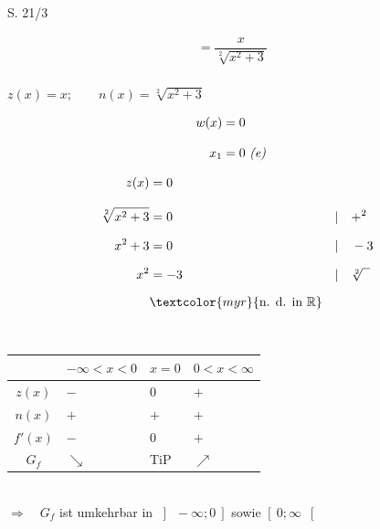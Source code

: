 \begin{Exercise}{S. 21/3}{}
\begin{enumerate}
\begin{enumerate}[label=\alph*)]
{\begin{itemize}[leftmargin=*]
{\begin{align*}
                            &= \dfrac{x}{\sqrt[2]{x^2 +3}} &&
                        \end{align*}\\[-1.0ex]
                        $z(x) = x; \qquad n(x) = \sqrt[2]{x^2 +3}$\\[-2.0ex]
                        \begin{minipage}[t]{0.35\linewidth}
                            \begin{align*}
                                w(x) &= 0 &&\\[2.0ex]
                                x_{1} &= 0 \ \text{\textit{(e)}} &&
                            \end{align*}
                        \end{minipage}
                        \hfill
                        \begin{minipage}[t]{0.50\linewidth}
                            \begin{align*}
                                z(x) &= 0 && \\[2.0ex]
                                \sqrt[2]{x^2 +3} &= 0 &&| \quad + ^{2}\\[1.5ex]
                                x^2 +3 &= 0 &&| \quad -3\\[1.5ex]
                                x^{2} &= -3 &&| \quad \sqrt[2]{\phantom{x}}\\[1.5ex]
                                & \textcolor{myr}{\text{n. d. in } \mathbb{R}} &&\\
                            \end{align*}
                        \end{minipage}\\
                        \begin{tabularx}{0.95\linewidth}{c|X|X|X}
                            & $-\infty < x < 0$ & $x = 0$ & $0 < x < \infty$ \\ \hline
                            $z(x)$ & $-$ & $0$ & $+$ \\ \hline
                            $n(x)$ & $+$ & $+$ & $+$ \\ \hline
                            $f'(x)$ & $-$ & $0$ & $+$ \\ \hline
                            $G_{f}$ & $\searrow$ & TiP & $\nearrow$ \\              
                        \end{tabularx}\\[4.0ex]
                        $\Rightarrow \quad G_{f}$ ist umkehrbar in $\left] \ -\infty; 0 \ \right]$ sowie $\left[ \ 0; \infty \ \right[$\\[-1.0ex]
}
\end{itemize}}
\end{enumerate}
\end{enumerate}
\end{Exercise}
